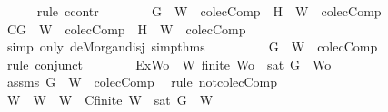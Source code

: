 \begin{isabellebody}
\ \ \ \ \isamarkupfalse%
\ {\isacharparenleft}rule\ ccontr{\isacharparenright}\isanewline
\ \ \ \ \ \ \isamarkupfalse%
\ {\isachardoublequoteopen}{\isasymnot}{\isacharparenleft}{\isacharbraceleft}G{\isacharbraceright}\ {\isasymunion}\ W\ {\isasymin}\ colecComp\ {\isasymor}\ {\isacharbraceleft}H{\isacharbraceright}\ {\isasymunion}\ W\ {\isasymin}\ colecComp{\isacharparenright}{\isachardoublequoteclose}\isanewline
\ \ \ \ \ \ \isamarkupfalse%
\ \isamarkupfalse%
\ C{\isacharcolon}{\isachardoublequoteopen}{\isacharbraceleft}G{\isacharbraceright}\ {\isasymunion}\ W\ {\isasymnotin}\ colecComp\ {\isasymand}\ {\isacharbraceleft}H{\isacharbraceright}\ {\isasymunion}\ W\ {\isasymnotin}\ colecComp{\isachardoublequoteclose}\isanewline
\ \ \ \ \ \ \ \ \isamarkupfalse%
\ {\isacharparenleft}simp\ only{\isacharcolon}\ de{\isacharunderscore}Morgan{\isacharunderscore}disj\ simp{\isacharunderscore}thms{\isacharparenleft}{}{\isacharparenright}{\isacharparenright}\isanewline
\ \ \ \ \ \ \isamarkupfalse%
\ \isamarkupfalse%
\ {\isachardoublequoteopen}{\isacharbraceleft}G{\isacharbraceright}\ {\isasymunion}\ W\ {\isasymnotin}\ colecComp{\isachardoublequoteclose}\isanewline
\ \ \ \ \ \ \ \ \isamarkupfalse%
\ {\isacharparenleft}rule\ conjunct{}{\isacharparenright}\isanewline
\ \ \ \ \ \ \isamarkupfalse%
\ Ex{}{\isacharcolon}{\isachardoublequoteopen}{\isasymexists}Wo\ {\isasymsubseteq}\ W{\isachardot}\ finite\ Wo\ {\isasymand}\ {\isasymnot}{\isacharparenleft}sat\ {\isacharparenleft}{\isacharbraceleft}G{\isacharbraceright}\ {\isasymunion}\ Wo{\isacharparenright}{\isacharparenright}{\isachardoublequoteclose}\isanewline
\ \ \ \ \ \ \ \ \isamarkupfalse%
\ assms\ {\isacartoucheopen}{\isacharbraceleft}G{\isacharbraceright}\ {\isasymunion}\ W\ {\isasymnotin}\ colecComp{\isacartoucheclose}\ \isamarkupfalse%
\ {\isacharparenleft}rule\ not{\isacharunderscore}colecComp{\isacharparenright}\isanewline
\ \ \ \ \ \ \isamarkupfalse%
\ W{}\ \ {\isachardoublequoteopen}W{}\ {\isasymsubseteq}\ W{\isachardoublequoteclose}\ \ C{}{\isacharcolon}{\isachardoublequoteopen}finite\ W{}\ {\isasymand}\ {\isasymnot}{\isacharparenleft}sat\ {\isacharparenleft}{\isacharbraceleft}G{\isacharbraceright}\ {\isasymunion}\ W{}{\isacharparenright}{\isacharparenright}{\isachardoublequoteclose}\isanewline

\end{isabellebody}
